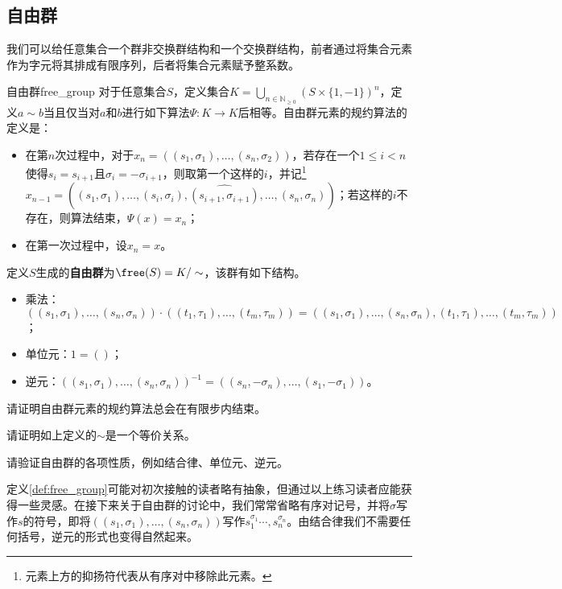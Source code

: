 \documentclass[../main.tex]{subfiles}
\begin{document}
\subsection{自由群}
我们可以给任意集合一个群非交换群结构和一个交换群结构，前者通过将集合元素作为字元将其排成有限序列，后者将集合元素赋予整系数。
\begin{definition}{自由群}{free_group}
对于任意集合$S$，定义集合$K=\bigcup_{n\in\mathbb{N}_{\geq0}}(S\times\{1,-1\})^n$，定义$a\sim b$当且仅当对$a$和$b$进行如下算法$\Psi:K\to K$后相等。自由群元素的规约算法的定义是：
\begin{itemize}
    \item 在第$n$次过程中，对于$x_n=((s_1,\sigma_1),\dots,(s_n,\sigma_2))$，若存在一个$1\leq i<n$使得$s_i=s_{i+1}$且$\sigma_i=-\sigma_{i+1}$，则取第一个这样的$i$，并记\footnote{元素上方的抑扬符代表从有序对中移除此元素。}$x_{n-1}=((s_1,\sigma_1),\dots,\widehat{(s_i,\sigma_i)},\widehat{(s_{i+1},\sigma_{i+1})},\dots,(s_n,\sigma_n))$；若这样的$i$不存在，则算法结束，$\Psi(x)=x_n$；
    \item 在第一次过程中，设$x_n=x$。
\end{itemize}
定义$S$生成的\textbf{自由群}为$\free(S)=K/\sim$，该群有如下结构。
\begin{itemize}
    \item 乘法：$((s_1,\sigma_1),\dots,(s_n,\sigma_n))\cdot((t_1,\tau_1),\dots,(t_m,\tau_m))=((s_1,\sigma_1),\dots,(s_n,\sigma_n),(t_1,\tau_1),\dots,(t_m,\tau_m))$；
    \item 单位元：$1=()$；
    \item 逆元：$((s_1,\sigma_1),\dots,(s_n,\sigma_n))^{-1}=((s_n,-\sigma_n),\dots,(s_1,-\sigma_1))$。
\end{itemize}
\end{definition}
\begin{exercise}
请证明自由群元素的规约算法总会在有限步内结束。
\end{exercise}
\begin{exercise}
请证明如上定义的$\sim$是一个等价关系。
\end{exercise}
\begin{exercise}
请验证自由群的各项性质，例如结合律、单位元、逆元。
\end{exercise}
\begin{remark}
定义\ref{def:free_group}可能对初次接触的读者略有抽象，但通过以上练习读者应能获得一些灵感。在接下来关于自由群的讨论中，我们常常省略有序对记号，并将$\sigma$写作$s$的符号，即将$((s_1,\sigma_1),\dots,(s_n,\sigma_n))$写作$s_1^{\sigma_1}\cdots,s_n^{\sigma_n}$。由结合律我们不需要任何括号，逆元的形式也变得自然起来。
\end{remark}
\end{document}
